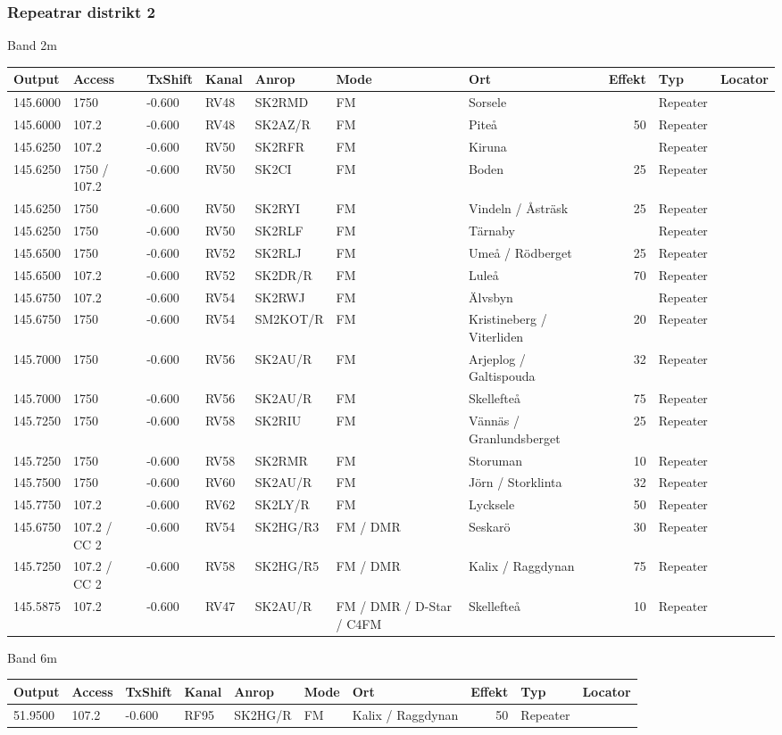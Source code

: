 \subsubsection{Repeatrar distrikt 2}
\large{Band 2m}
\begin{longtable}{lllllllrlr}
Output & Access & TxShift & Kanal & Anrop & Mode & Ort & Effekt & Typ & Locator \\ \hline
145.6000&1750&-0.600&RV48&SK2RMD&FM&Sorsele&&Repeater&\\
145.6000&107.2&-0.600&RV48&SK2AZ/R&FM&Piteå&50&Repeater&\\
145.6250&107.2&-0.600&RV50&SK2RFR&FM&Kiruna&&Repeater&\\
145.6250&1750 / 107.2&-0.600&RV50&SK2CI&FM&Boden&25&Repeater&\\
145.6250&1750&-0.600&RV50&SK2RYI&FM&Vindeln / Åsträsk&25&Repeater&\\
145.6250&1750&-0.600&RV50&SK2RLF&FM&Tärnaby&&Repeater&\\
145.6500&1750&-0.600&RV52&SK2RLJ&FM&Umeå / Rödberget&25&Repeater&\\
145.6500&107.2&-0.600&RV52&SK2DR/R&FM&Luleå&70&Repeater&\\
145.6750&107.2&-0.600&RV54&SK2RWJ&FM&Älvsbyn&&Repeater&\\
145.6750&1750&-0.600&RV54&SM2KOT/R&FM&Kristineberg / Viterliden&20&Repeater&\\
145.7000&1750&-0.600&RV56&SK2AU/R&FM&Arjeplog / Galtispouda&32&Repeater&\\
145.7000&1750&-0.600&RV56&SK2AU/R&FM&Skellefteå&75&Repeater&\\
145.7250&1750&-0.600&RV58&SK2RIU&FM&Vännäs / Granlundsberget&25&Repeater&\\
145.7250&1750&-0.600&RV58&SK2RMR&FM&Storuman&10&Repeater&\\
145.7500&1750&-0.600&RV60&SK2AU/R&FM&Jörn / Storklinta&32&Repeater&\\
145.7750&107.2&-0.600&RV62&SK2LY/R&FM&Lycksele&50&Repeater&\\
145.6750&107.2 / CC 2&-0.600&RV54&SK2HG/R3&FM / DMR&Seskarö&30&Repeater&\\
145.7250&107.2 / CC 2&-0.600&RV58&SK2HG/R5&FM / DMR&Kalix / Raggdynan&75&Repeater&\\
145.5875&107.2&-0.600&RV47&SK2AU/R&FM / DMR / D-Star / C4FM&Skellefteå&10&Repeater&\\
\end{longtable}
\large{Band 6m}
\begin{longtable}{lllllllrlr}
Output & Access & TxShift & Kanal & Anrop & Mode & Ort & Effekt & Typ & Locator \\ \hline
51.9500&107.2&-0.600&RF95&SK2HG/R&FM&Kalix / Raggdynan&50&Repeater&\\
\end{longtable}
